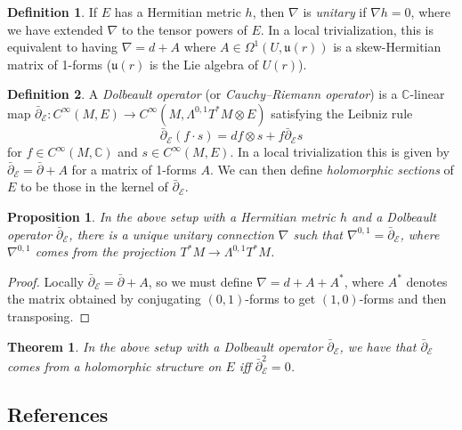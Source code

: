 \documentclass[a4paper]{article}
\newtheorem*{theorem}{Theorem}
\newtheorem*{proposition}{Proposition}
\theoremstyle{definition}
\newtheorem*{definition}{Definition}
\theoremstyle{remark}
\newcommand{\E}{\mathcal{E}}
\renewcommand{\u}{\mathfrak{u}}
\newcommand{\C}{\mathbb{C}}
\begin{document}
\begin{definition}
    If $E$ has a Hermitian metric $h$, then $\nabla$ is \emph{unitary} if
    $\nabla h=0$, where we have extended $\nabla$ to the tensor powers of $E$.
    In a local trivialization, this is equivalent to having $\nabla=d+A$ where
    $A\in\Omega^1(U,\u(r))$ is a skew-Hermitian matrix of 1-forms ($\u(r)$ is
    the Lie algebra of $U(r)$).
\end{definition}

\begin{definition}
    A \emph{Dolbeault operator} (or \emph{Cauchy--Riemann operator}) is a
    $\C$-linear map
    $\bar\partial_\E:C^\infty(M,E)\to C^\infty(M,\Lambda^{0,1}T^*M\otimes E)$
    satisfying the Leibniz rule
    \begin{equation*}
        \bar\partial_\E(f\cdot s) = df\otimes s + f\bar\partial_\E s
    \end{equation*}
    for $f\in C^\infty(M,\C)$ and $s\in C^\infty(M,E)$. In a local
    trivialization this is given by $\bar\partial_\E=\bar\partial+A$ for a
    matrix of 1-forms $A$. We can then define \emph{holomorphic sections} of $E$
    to be those in the kernel of $\bar\partial_\E$.
\end{definition}

\begin{proposition}
    In the above setup with a Hermitian metric $h$ and a Dolbeault operator
    $\bar\partial_\E$, there is a unique unitary connection $\nabla$ such that
    $\nabla^{0,1}=\bar\partial_\E$, where $\nabla^{0,1}$ comes from the
    projection $T^*M\to\Lambda^{0,1}T^*M$.
\end{proposition}

\begin{proof}
    Locally $\bar\partial_\E=\bar\partial+A$, so we must define $\nabla=d+A+A^*$,
    where $A^*$ denotes the matrix obtained by conjugating $(0,1)$-forms to get
    $(1,0)$-forms and then transposing.
\end{proof}

\begin{theorem}
    In the above setup with a Dolbeault operator $\bar\partial_\E$, we have that
    $\bar\partial_\E$ comes from a holomorphic structure on $E$ iff
    $\bar\partial_\E^2=0$.
\end{theorem}

\subsection*{References}
\end{document}
